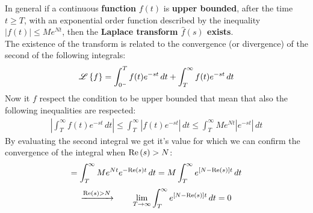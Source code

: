 		\vspace{3mm}
		In general if a continuous \textbf{function} $f(t)$ is \textbf{upper bounded}, after the time $t\geq T$, with an exponential order function described by the inequality $|f(t)| \leq M e^{Nt}$, then the \textbf{Laplace transform $\hat f(s)$ exists}. \\
		The existence of the transform is related to the convergence (or divergence) of the second of the following integrals:
		\[ \mathscr{L} \left\{ f \right\} = \int_{0^-}^T f(t)e^{-st} \, dt + \int_T^\infty f(t)e^{-st} \, dt \]
		Now it $f$ respect the condition to be upper bounded that mean that also the following inequalities are respected:
		\begin{align*}
			\left| \int_T^\infty f(t)e^{-st}\, dt  \right| \leq  \int_T^\infty \left|f(t)e^{-st}\right|\, dt   \leq \int_T^\infty M e^{Nt} \left|e^{-st}\right|\, dt
		\end{align*}
		By evaluating the second integral we get it's value for which we can confirm the convergence of the integral when $\textrm{Re}\left(s\right) > N$:
		\[ = \int_T^\infty Me^{Nt} e^{-\textrm{Re}\left(s\right) t} \, dt = M \int_T^\infty e^{\left[N-\textrm{Re}\left(s\right)\right]t} \, dt\]
		\[ \xrightarrow{\textrm{Re}\left(s\right) > N} \qquad \lim_{T\rightarrow \infty} \int_T^{\infty} e^{\left[ N -\textrm{Re}\left(s\right)\right]t} \, dt = 0 \]
		
		
		
		
		
		
		
		
		
		
		
		
		
		
		
		
		
		
		
		
		
		
		
		
		
		
		
		
		
		
		
		
		
		
		
		
		
		
		